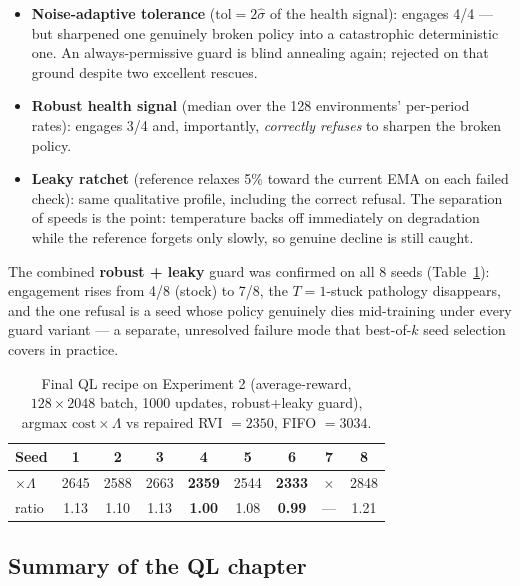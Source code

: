 \documentclass[11pt,a4paper]{article}
\begin{document}
\begin{itemize}
  \item \textbf{Noise-adaptive tolerance} ($\mathrm{tol} = 2\hat\sigma$
  of the health signal): engages 4/4 --- but sharpened one genuinely
  broken policy into a catastrophic deterministic one.  An
  always-permissive guard is blind annealing again; rejected on that
  ground despite two excellent rescues.
  \item \textbf{Robust health signal} (median over the 128 environments'
  per-period rates): engages 3/4 and, importantly, \emph{correctly
  refuses} to sharpen the broken policy.
  \item \textbf{Leaky ratchet} (reference relaxes 5\% toward the current
  EMA on each failed check): same qualitative profile, including the
  correct refusal.  The separation of speeds is the point: temperature
  backs off immediately on degradation while the reference forgets only
  slowly, so genuine decline is still caught.
\end{itemize}

The combined \textbf{robust + leaky} guard was confirmed on all 8 seeds
(Table~\ref{tab:qlfinal}): engagement rises from 4/8 (stock) to 7/8, the
$T{=}1$-stuck pathology disappears, and the one refusal is a seed whose
policy genuinely dies mid-training under every guard variant --- a
separate, unresolved failure mode that best-of-$k$ seed selection covers
in practice.

\begin{table}[h]
\centering
\caption{Final QL recipe on Experiment 2 (average-reward, $128 \times
2048$ batch, 1000 updates, robust+leaky guard), argmax
$\mathrm{cost}\times\Lambda$ vs repaired RVI $= 2350$, FIFO $= 3034$.}
\label{tab:qlfinal}
\begin{tabular}{lcccccccc}
\toprule
Seed & 1 & 2 & 3 & 4 & 5 & 6 & 7 & 8 \\
\midrule
$\times\Lambda$ & 2645 & 2588 & 2663 & \textbf{2359} & 2544 &
\textbf{2333} & $\times$ & 2848 \\
ratio & 1.13 & 1.10 & 1.13 & \textbf{1.00} & 1.08 & \textbf{0.99} &
--- & 1.21 \\
\bottomrule
\end{tabular}
\end{table}

\subsection{Summary of the QL chapter}
\end{document}
